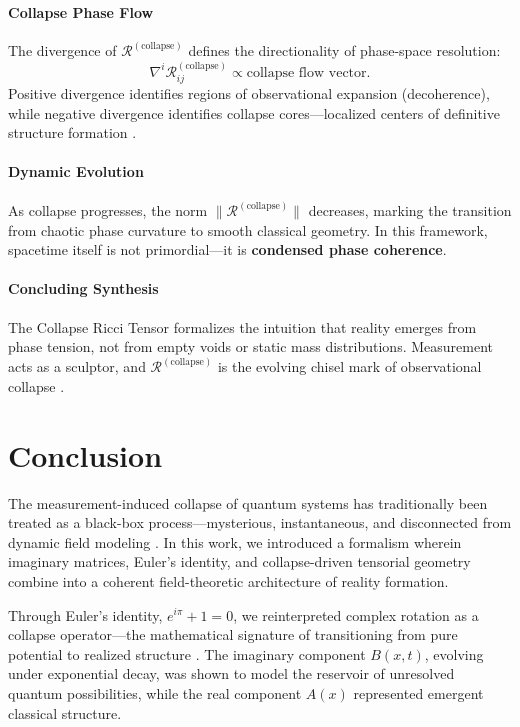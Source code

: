 \paragraph{Collapse Phase Flow}
The divergence of $\mathcal{R}^{(\text{collapse})}$ defines the directionality of phase-space resolution:
\[
\nabla^i \mathcal{R}^{(\text{collapse})}_{ij} \propto \text{collapse flow vector}.
\]
Positive divergence identifies regions of observational expansion (decoherence), while negative divergence identifies collapse cores---localized centers of definitive structure formation \cite{diosi_penrose_model, penrose_gravity_1996}.

\paragraph{Dynamic Evolution}
As collapse progresses, the norm $\|\mathcal{R}^{(\text{collapse})}\|$ decreases, marking the transition from chaotic phase curvature to smooth classical geometry. In this framework, spacetime itself is not primordial---it is \textbf{condensed phase coherence}.

\paragraph{Concluding Synthesis}
The Collapse Ricci Tensor formalizes the intuition that reality emerges from phase tension, not from empty voids or static mass distributions. Measurement acts as a sculptor, and $\mathcal{R}^{(\text{collapse})}$ is the evolving chisel mark of observational collapse \cite{bassi_models_2013}.

\section{Conclusion}

The measurement-induced collapse of quantum systems has traditionally been treated as a black-box process---mysterious, instantaneous, and disconnected from dynamic field modeling \cite{bassi_models_2013, gisin_epistemology_2014}. In this work, we introduced a formalism wherein imaginary matrices, Euler's identity, and collapse-driven tensorial geometry combine into a coherent field-theoretic architecture of reality formation.

Through Euler's identity, $e^{i\pi} + 1 = 0$, we reinterpreted complex rotation as a collapse operator---the mathematical signature of transitioning from pure potential to realized structure \cite{euler_formula_foundation, euler_complex_plane}. The imaginary component $B(x,t)$, evolving under exponential decay, was shown to model the reservoir of unresolved quantum possibilities, while the real component $A(x)$ represented emergent classical structure.

